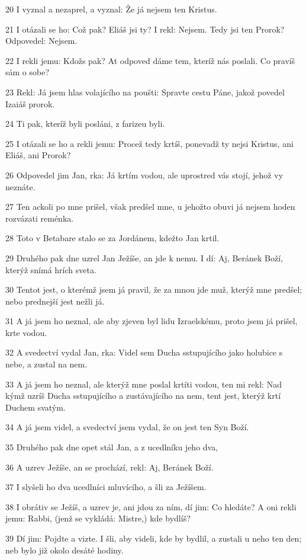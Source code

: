 \par 20 I vyznal a nezaprel, a vyznal: Že já nejsem ten Kristus.
\par 21 I otázali se ho: Což pak? Eliáš jsi ty? I rekl: Nejsem. Tedy jsi ten Prorok? Odpovedel: Nejsem.
\par 22 I rekli jemu: Kdožs pak? At odpoved dáme tem, kteríž nás poslali. Co pravíš sám o sobe?
\par 23 Rekl: Já jsem hlas volajícího na poušti: Spravte cestu Páne, jakož povedel Izaiáš prorok.
\par 24 Ti pak, kteríž byli posláni, z farizeu byli.
\par 25 I otázali se ho a rekli jemu: Procež tedy krtíš, ponevadž ty nejsi Kristus, ani Eliáš, ani Prorok?
\par 26 Odpovedel jim Jan, rka: Já krtím vodou, ale uprostred vás stojí, jehož vy neznáte.
\par 27 Ten ackoli po mne prišel, však predšel mne, u jehožto obuvi já nejsem hoden rozvázati reménka.
\par 28 Toto v Betabare stalo se za Jordánem, kdežto Jan krtil.
\par 29 Druhého pak dne uzrel Jan Ježíše, an jde k nemu. I dí: Aj, Beránek Boží, kterýž snímá hrích sveta.
\par 30 Tentot jest, o kterémž jsem já pravil, že za mnou jde muž, kterýž mne predšel; nebo prednejší jest nežli já.
\par 31 A já jsem ho neznal, ale aby zjeven byl lidu Izraelskému, proto jsem já prišel, krte vodou.
\par 32 A svedectví vydal Jan, rka: Videl sem Ducha sstupujícího jako holubice s nebe, a zustal na nem.
\par 33 A já jsem ho neznal, ale kterýž mne poslal krtíti vodou, ten mi rekl: Nad kýmž uzríš Ducha sstupujícího a zustávajícího na nem, tent jest, kterýž krtí Duchem svatým.
\par 34 A já jsem videl, a svedectví jsem vydal, že on jest ten Syn Boží.
\par 35 Druhého pak dne opet stál Jan, a z ucedlníku jeho dva,
\par 36 A uzrev Ježíše, an se prochází, rekl: Aj, Beránek Boží.
\par 37 I slyšeli ho dva ucedlníci mluvícího, a šli za Ježíšem.
\par 38 I obrátiv se Ježíš, a uzrev je, ani jdou za ním, dí jim: Co hledáte? A oni rekli jemu: Rabbi, (jenž se vykládá: Mistre,) kde bydlíš?
\par 39 Dí jim: Pojdte a vizte. I šli, aby videli, kde by bydlil, a zustali u neho ten den; neb bylo již okolo desáté hodiny.
